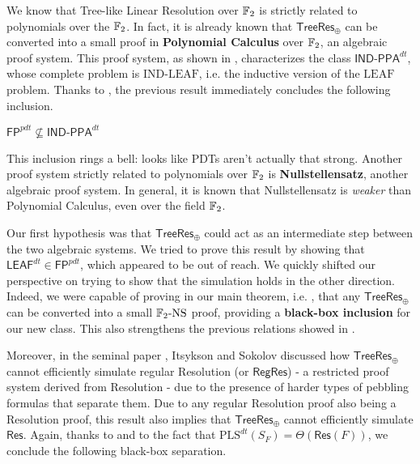 We know that Tree-like Linear Resolution over $\mathbb{F}_2$ is strictly related to polynomials over the $\mathbb{F}_2$. In fact, it is already known \cite{treeres2_in_pc} that $\mathsf{TreeRes}_\oplus$ can be converted into a small proof in \textbf{Polynomial Calculus} over $\mathbb{F}_2$, an algebraic proof system. This proof system, as shown in \cite{tfnp_characterization}, characterizes the  class $\mathsf{IND\text{-}PPA}^{dt}$, whose complete problem is $\mathrm{IND\text{-}LEAF}$, i.e. the inductive version of the $\mathrm{LEAF}$ problem. Thanks to , the previous result immediately concludes the following inclusion.

\begin{proposition}
    \label{fp_pdt_inside_ind_ppa_dt}
    $\mathsf{FP}^{pdt} \not\subseteq \mathsf{IND\text{-}PPA}^{dt}$
\end{proposition}

This inclusion rings a bell: looks like PDTs aren't actually that strong. Another proof system strictly related to polynomials over $\mathbb{F}_2$ is \textbf{Nullstellensatz}, another algebraic proof system. In general, it is known that Nullstellensatz is \textit{weaker} than Polynomial Calculus, even over the field $\mathbb{F}_2$.

Our first hypothesis was that $\mathsf{TreeRes}_\oplus$ could act as an intermediate step between the two algebraic systems. We tried to prove this result by showing that $\mathsf{LEAF}^{dt} \in \mathsf{FP}^{pdt}$, which appeared to be out of reach. We quickly shifted our perspective on trying to show that the simulation holds in the other direction. Indeed, we were capable of proving in our main theorem, i.e. , that any $\mathsf{TreeRes}_\oplus$ can be converted into a small $\mathrm{\mathbb{F}_2\text{-}NS}$ proof, providing a \textbf{black-box inclusion} for our new class. This also strengthens the previous relations showed in \cite{treeres2_in_pc}.

Moreover, in the seminal paper \cite{res_lin_2}, Itsykson and Sokolov discussed how $\mathsf{TreeRes}_\oplus$ cannot efficiently simulate regular Resolution (or $\mathsf{RegRes}$) - a restricted proof system derived from Resolution - due to the presence of harder types of pebbling formulas that separate them. Due to any regular Resolution proof also being a Resolution proof, this result also implies that $\mathsf{TreeRes}_\oplus$ cannot efficiently simulate $\mathsf{Res}$. Again, thanks to  and to the fact that $\mathrm{PLS}^{dt}(S_F) = \Theta(\mathsf{Res}(F))$, we conclude the following black-box separation.

